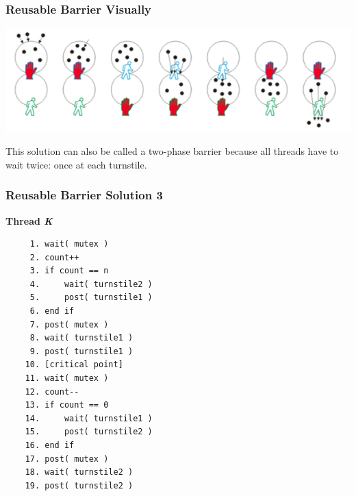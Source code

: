 \begin{frame}
\frametitle{Reusable Barrier Visually}

\begin{center}
\includegraphics[width=\textwidth]{images/reusable-barrier.png}
\end{center}

This solution can also be called a \alert{two-phase barrier} because all threads have to wait twice: once at each turnstile.

\end{frame}

\begin{frame}[fragile]
\frametitle{Reusable Barrier Solution 3}
\vspace{-0.5em}
\textbf{Thread \textit{K}}\vspace{-0.5em}
  \begin{verbatim}
	 1. wait( mutex )
	 2. count++
	 3. if count == n
	 4.     wait( turnstile2 )
	 5.     post( turnstile1 )
	 6. end if
	 7. post( mutex )
	 8. wait( turnstile1 )
	 9. post( turnstile1 )
	10. [critical point]
	11. wait( mutex )
	12. count--
	13. if count == 0
	14.     wait( turnstile1 )
	15.     post( turnstile2 )
	16. end if
	17. post( mutex )
	18. wait( turnstile2 )
	19. post( turnstile2 )
  \end{verbatim}
\vspace{-2em}


\end{frame}





